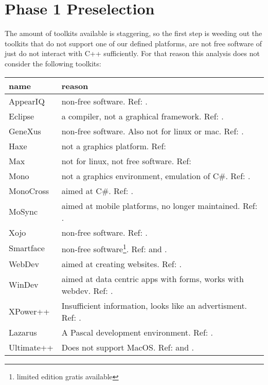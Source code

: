 \section{Phase 1 Preselection}

The amount of toolkits available is staggering, so the first step is weeding
out the toolkits that do not support one of our defined platforms, are not free
software of just do not interact with C++ sufficiently.  For that reason this
analysis does not consider the following toolkits:

\begin{center}
    \begin{tabular}{|p{7em}|p{25em}|}
	\hline
	{\bf name} & {\bf reason}\\\hline
	AppearIQ & non-free software. Ref: \cite{appear:appeariq}.\\
	Eclipse & a compiler, not a graphical framework. Ref: \cite{wiki:eclipse}.\\
	GeneXus & non-free software. Also not for linux
		    or mac. Ref: \cite{wiki:genexus}. \\
	Haxe & not a graphics platform. Ref: \cite{wiki:haxe}\\
	Max & not for linux, not free software. Ref: \cite{wiki:max}\\
	Mono & not a graphics environment, emulation
		of C\#. Ref: \cite{wiki:mono}.\\
	MonoCross & aimed at C\#. Ref: \cite{wiki:monocross}.\\
	MoSync & aimed at mobile platforms, no longer maintained. Ref: \cite{wiki:mosync}.\\
	Xojo & non-free software. Ref: \cite{wiki:xojo}.\\
	Smartface & non-free software\footnote{limited edition gratis available}. Ref: \cite{wiki:smartface} and \cite{smartface:license}.\\
	WebDev & aimed at creating websites. Ref: \cite{wiki:webdev}.\\
	WinDev & aimed at data centric apps with forms, works with webdev. Ref: \cite{wiki:windev}.\\
	XPower++ & Insufficient information, looks like an advertisment. Ref: \cite{wiki:xpower++}.\\
	Lazarus & A Pascal development environment. Ref: \cite{wiki:lazarus}.\\
	Ultimate++ & Does not support MacOS. Ref: \cite{wiki:ultimate++} and \cite{wxwidget:comparison}.\\
	\hline
    \end{tabular}
	\label{tab:discarded-toolkits}
\end{center}


